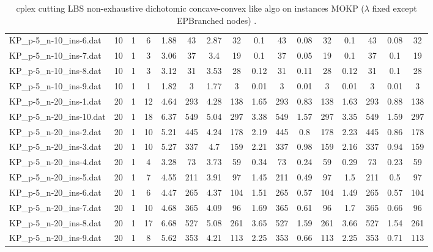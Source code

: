 \begin{sidewaystable}[!ht]
{\begin{tabular}{lccccccccccccccc}
KP\_p-5\_n-10\_ins-6.dat & 10 & 1 & 6 & 1.88 & 43 & 2.87 & 32 & 0.1 & 43 &  \textcolor{blue2}{0.08} & 32 & 0.1 & 43 &  \textcolor{blue2}{0.08} & 32 \\
KP\_p-5\_n-10\_ins-7.dat & 10 & 1 & 3 & 3.06 & 37 & 3.4 & 19 & 0.1 & 37 &  \textcolor{blue2}{0.05} & 19 & 0.1 & 37 & 0.1 & 19 \\
KP\_p-5\_n-10\_ins-8.dat & 10 & 1 & 3 & 3.12 & 31 & 3.53 & 28 & 0.12 & 31 & 0.11 & 28 & 0.12 & 31 &  \textcolor{blue2}{0.1} & 28 \\
KP\_p-5\_n-10\_ins-9.dat & 10 & 1 & 1 & 1.82 & 3 & 1.77 & 3 &  \textcolor{blue2}{0.01} & 3 &  \textcolor{blue2}{0.01} & 3 &  \textcolor{blue2}{0.01} & 3 &  \textcolor{blue2}{0.01} & 3 \\
KP\_p-5\_n-20\_ins-1.dat & 20 & 1 & 12 & 4.64 & 293 & 4.28 & 138 & 1.65 & 293 &  \textcolor{blue2}{0.83} & 138 & 1.63 & 293 & 0.88 & 138 \\
KP\_p-5\_n-20\_ins-10.dat & 20 & 1 & 18 & 6.37 & 549 & 5.04 & 297 & 3.38 & 549 & 1.57 & 297 & 3.35 & 549 & 1.59 & 297 \\
KP\_p-5\_n-20\_ins-2.dat & 20 & 1 & 10 & 5.21 & 445 & 4.24 & 178 & 2.19 & 445 &  \textcolor{blue2}{0.8} & 178 & 2.23 & 445 & 0.86 & 178 \\
KP\_p-5\_n-20\_ins-3.dat & 20 & 1 & 10 & 5.27 & 337 & 4.7 & 159 & 2.21 & 337 & 0.98 & 159 & 2.16 & 337 &  \textcolor{blue2}{0.94} & 159 \\
KP\_p-5\_n-20\_ins-4.dat & 20 & 1 & 4 & 3.28 & 73 & 3.73 & 59 & 0.34 & 73 & 0.24 & 59 & 0.29 & 73 &  \textcolor{blue2}{0.23} & 59 \\
KP\_p-5\_n-20\_ins-5.dat & 20 & 1 & 7 & 4.55 & 211 & 3.91 & 97 & 1.45 & 211 &  \textcolor{blue2}{0.49} & 97 & 1.5 & 211 & 0.5 & 97 \\
KP\_p-5\_n-20\_ins-6.dat & 20 & 1 & 6 & 4.47 & 265 & 4.37 & 104 & 1.51 & 265 & 0.57 & 104 & 1.49 & 265 & 0.57 & 104 \\
KP\_p-5\_n-20\_ins-7.dat & 20 & 1 & 10 & 4.68 & 365 & 4.09 & 96 & 1.69 & 365 &  \textcolor{blue2}{0.61} & 96 & 1.7 & 365 & 0.66 & 96 \\
KP\_p-5\_n-20\_ins-8.dat & 20 & 1 & 17 & 6.68 & 527 & 5.08 & 261 & 3.65 & 527 & 1.59 & 261 & 3.66 & 527 &  \textcolor{blue2}{1.54} & 261 \\
KP\_p-5\_n-20\_ins-9.dat & 20 & 1 & 8 & 5.62 & 353 & 4.21 & 113 & 2.25 & 353 &  \textcolor{blue2}{0.66} & 113 & 2.25 & 353 & 0.71 & 113 \\
\bottomrule
\end{tabular}
}%
\caption{cplex cutting LBS non-exhaustive dichotomic concave-convex like algo on instances MOKP ($\lambda$ fixed except EPBranched nodes) .}
\end{sidewaystable}
